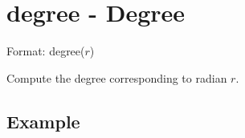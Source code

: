 
%

\section{degree - Degree\label{sect:degree}}

Format: degree($r$)

Compute the degree corresponding to radian $r$. 

\subsection*{Example}


%

